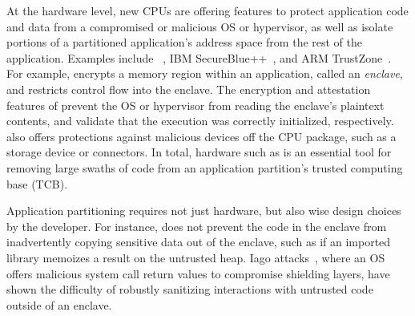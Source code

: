 At the hardware level, 
new CPUs are offering features to protect application code and data
from a compromised or malicious OS or hypervisor,
as well as isolate portions of a partitioned 
application's address space from the rest of the application.
Examples include \intel{} \sgx{}~\cite{sgx-manual}, 
IBM SecureBlue++~\cite{secureblue++}, and ARM TrustZone~\cite{trustzone}.
For example, \sgx{}
encrypts a memory region within an application, called an {\em enclave},
and restricts control flow into the enclave.
The encryption and attestation features of \sgx{}
prevent the OS or hypervisor from reading the enclave's plaintext contents,
and validate that the execution was correctly initialized, respectively.
\sgx{} also offers  protections against malicious devices off the CPU package,
such as a storage device or connectors.
In total, hardware such as \sgx{} is an essential tool for removing
large swaths of code from an application partition's trusted computing base (TCB).

Application partitioning requires not just hardware, but also wise design choices
by the developer.
For instance, 
\sgx{} does not prevent the code in the enclave from
inadvertently copying sensitive data out of the enclave,
 such as if an imported library memoizes a result on the untrusted heap.
Iago attacks~\cite{iago}, where an OS offers malicious system call return values to compromise shielding layers,
have shown the difficulty of robustly sanitizing interactions with
untrusted code outside of an enclave.


